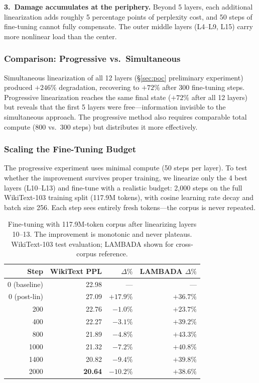 \documentclass[11pt]{article}
\begin{document}
\textbf{3.\ Damage accumulates at the periphery.} Beyond 5 layers, each additional linearization adds roughly 5 percentage points of perplexity cost, and 50 steps of fine-tuning cannot fully compensate. The outer middle layers (L4--L9, L15) carry more nonlinear load than the center.

\subsubsection{Comparison: Progressive vs.\ Simultaneous}

Simultaneous linearization of all 12 layers (\S\ref{sec:poc} preliminary experiment) produced $+246\%$ degradation, recovering to $+72\%$ after 300 fine-tuning steps. Progressive linearization reaches the same final state ($+72\%$ after all 12 layers) but reveals that the first 5 layers were free---information invisible to the simultaneous approach. The progressive method also requires comparable total compute (800 vs.\ 300 steps) but distributes it more effectively.

\subsubsection{Scaling the Fine-Tuning Budget}
\label{sec:beefy}

The progressive experiment uses minimal compute (50 steps per layer). To test whether the improvement survives proper training, we linearize only the 4 best layers (L10--L13) and fine-tune with a realistic budget: 2,000 steps on the full WikiText-103 training split (117.9M tokens), with cosine learning rate decay and batch size 256. Each step sees entirely fresh tokens---the corpus is never repeated.

\begin{table}[t]
\centering
\caption{Fine-tuning with 117.9M-token corpus after linearizing layers 10--13. The improvement is monotonic and never plateaus. WikiText-103 test evaluation; LAMBADA shown for cross-corpus reference.}
\label{tab:beefy}
\begin{tabular}{rrrr}
\toprule
Step & WikiText PPL & $\Delta\%$ & LAMBADA $\Delta\%$ \\
\midrule
0 (baseline) & 22.98 & --- & --- \\
0 (post-lin) & 27.09 & $+17.9\%$ & $+36.7\%$ \\
200 & 22.76 & $-1.0\%$ & $+23.7\%$ \\
400 & 22.27 & $-3.1\%$ & $+39.2\%$ \\
800 & 21.89 & $-4.8\%$ & $+43.3\%$ \\
1000 & 21.32 & $-7.2\%$ & $+40.8\%$ \\
1400 & 20.82 & $-9.4\%$ & $+39.8\%$ \\
2000 & \textbf{20.64} & $\mathbf{-10.2\%}$ & $+38.6\%$ \\
\bottomrule
\end{tabular}
\end{table}
\end{document}
